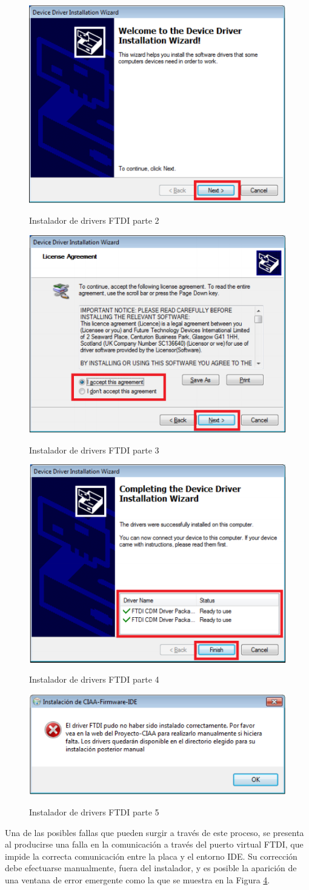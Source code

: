 \documentclass[12pt,letterpaper]{article}
\begin{document}
\begin{figure}[!h]
\centering
\includegraphics[width=5 cm]{figuras/instalacion8.png}\\
\caption{Instalador de drivers FTDI parte 2}
\label{Fig10}
\end{figure}
\begin{figure}[!h]
\centering
\includegraphics[width=6 cm]{figuras/instalacion9.png}\\
\caption{Instalador de drivers FTDI parte 3}
\label{Fig11}
\end{figure}
\begin{figure}[!h]
\centering
\includegraphics[width=6 cm]{figuras/instalacion10.png}\\
\caption{Instalador de drivers FTDI parte 4}
\label{Fig12}
\end{figure}
\begin{figure}[!h]
\centering
\includegraphics[width=9 cm]{figuras/instalacion11.png}\\
\caption{Instalador de drivers FTDI parte 5}
\label{Fig13}
\end{figure}
Una de las posibles fallas que pueden surgir a través de este proceso, se presenta al producirse una falla en la comunicación a través del puerto virtual FTDI, que impide la correcta comunicación entre la placa y el entorno IDE. Su corrección debe efectuarse manualmente, fuera del instalador, y es posible la aparición de una ventana de error emergente como la que se muestra en la Figura \ref{Fig13}.
 \\
 
\end{document}
